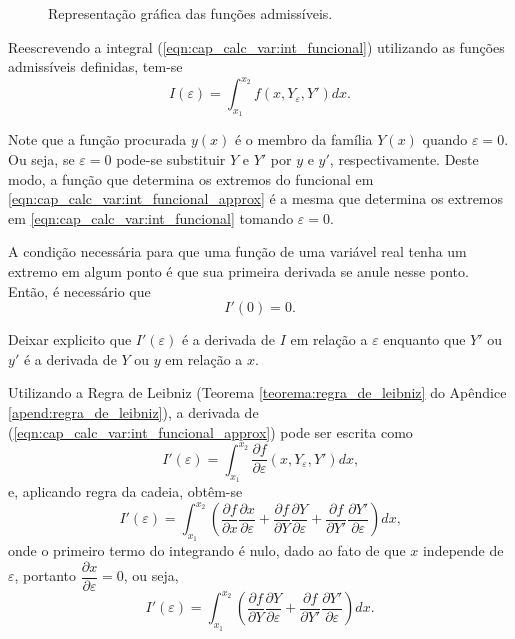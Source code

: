 \documentclass[
	12pt,				%
	openright,			%
    twoside,			%
	a4paper,			%
	english,			%
	french,				%
	spanish,			%
	brazil				%
	]{abntex2}
\numberwithin{lema}{chapter}
\numberwithin{teorema}{chapter}
\numberwithin{definicao}{chapter}
\numberwithin{exemplo}{chapter}
\numberwithin{figure}{chapter}
\begin{document}
\begin{figure}[!h]
	\caption{Representação gráfica das funções admissíveis.}
	\centering
	
	\resizebox{0.75\textwidth}{!}
	{
		
	}
	
	\label{fig:funcoes_admissiveis}
\end{figure}

Reescrevendo a integral (\ref{eqn:cap_calc_var:int_funcional}) utilizando as funções admissíveis definidas, tem-se
\begin{equation}\label{eqn:cap_calc_var:int_funcional_approx}
I(\varepsilon)=\int_{x_1}^{x_2}f(x, Y_{\varepsilon}, Y')dx\text{.}
\end{equation}

Note que a função procurada $y(x)$ é o membro da família $Y(x)$ quando $\varepsilon = 0$. Ou seja, se $\varepsilon = 0$ pode-se substituir $Y$ e $Y'$ por $y$ e $y'$, respectivamente. Deste modo, a função que determina os extremos do funcional em \eqref{eqn:cap_calc_var:int_funcional_approx} é a mesma que determina os extremos em \eqref{eqn:cap_calc_var:int_funcional} tomando $\varepsilon=0$.

A condição necessária para que uma função de uma variável real tenha um extremo em algum ponto é que sua primeira derivada se anule nesse ponto. Então, é necessário que
\begin{equation}\label{eqn:cap_calc_var:extrem_condition}
	I'(0)=0\text{.}
\end{equation}

{\color{red}Deixar explicito que $I'(\varepsilon)$ é a derivada de $I$ em relação a $\varepsilon$ enquanto que $Y'$ ou $y'$ é a derivada de $Y$ ou $y$ em relação a $x$.}

Utilizando a Regra de Leibniz (Teorema \ref{teorema:regra_de_leibniz} do Apêndice \ref{apend:regra_de_leibniz}), a derivada de (\ref{eqn:cap_calc_var:int_funcional_approx}) pode ser escrita como
$$I'(\varepsilon)=\int_{x_1}^{x_2} \frac{\partial f}{\partial \varepsilon} (x, Y_{\varepsilon}, Y') dx \text{,}$$
e, aplicando regra da cadeia, obtêm-se
$$I'(\varepsilon)=\int_{x_1}^{x_2}\left ( \frac{\partial f}{\partial x}\frac{\partial x}{\partial \varepsilon} + \frac{\partial f}{\partial Y} \frac{\partial Y}{\partial \varepsilon} + \frac{\partial f}{\partial Y'} \frac{\partial Y'}{\partial \varepsilon} \right )dx\text{,}$$
onde o primeiro termo do integrando é nulo, dado ao fato de que $x$ independe de $\varepsilon$, portanto $\dfrac{\partial x}{\partial \varepsilon}=0$, ou seja,
\begin{equation}\label{eqn:cap_calc_var:chain_rule}
I'(\varepsilon)=\int_{x_1}^{x_2}\left ( \frac{\partial f}{\partial Y}\frac{\partial Y}{\partial \varepsilon} + \frac{\partial f}{\partial Y'}\frac{\partial Y'}{\partial \varepsilon} \right ) dx \text{.}
\end{equation}
\end{document}
